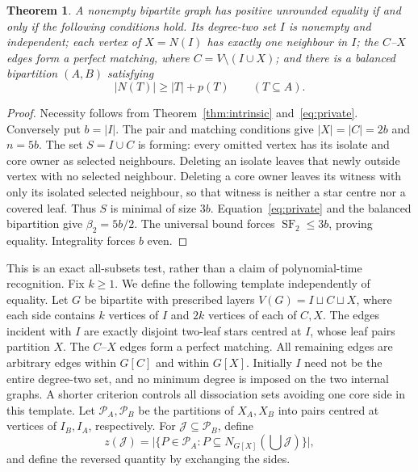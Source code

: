 \documentclass[11pt]{article}
\newtheorem{theorem}{Theorem}
\newcommand{\SF}{\operatorname{SF}_2}
\newcommand{\diss}{\beta_2}
\begin{document}
\begin{theorem}\label{thm:recognition}
A nonempty bipartite graph has positive unrounded equality if and only
if the following conditions hold. Its degree-two set $I$ is nonempty
and independent; each vertex of $X=N(I)$ has exactly one neighbour in
$I$; the $C$--$X$ edges form a perfect matching, where
$C=V\setminus(I\cup X)$; and there is a balanced bipartition $(A,B)$
satisfying
\[
 |N(T)|\ge |T|+p(T)\qquad(T\subseteq A).
\]
\end{theorem}
\begin{proof}
Necessity follows from Theorem~\ref{thm:intrinsic} and~\eqref{eq:private}.
Conversely put $b=|I|$. The pair and matching conditions give
$|X|=|C|=2b$ and $n=5b$. The set $S=I\cup C$ is forming: every
omitted vertex has its isolate and core owner as selected neighbours.
Deleting an isolate leaves that newly outside vertex with no selected
neighbour. Deleting a core owner leaves its witness with only its
isolated selected neighbour, so that witness is neither a star centre
nor a covered leaf. Thus $S$ is minimal of size $3b$.
Equation~\eqref{eq:private} and the balanced bipartition give
$\diss=5b/2$. The universal bound forces $\SF\le3b$, proving equality.
Integrality forces $b$ even.
\end{proof}

This is an exact all-subsets test, rather than a claim of polynomial-time
recognition. Fix $k\ge1$. We define the following template independently of equality.
Let $G$ be bipartite with prescribed layers $V(G)=I\sqcup C\sqcup X$,
where each side contains $k$ vertices of $I$ and $2k$ vertices of each
of $C,X$. The edges incident with $I$ are exactly disjoint two-leaf
stars centred at $I$, whose leaf pairs partition $X$. The $C$--$X$
edges form a perfect matching. All remaining edges are arbitrary
edges within $G[C]$ and within $G[X]$. Initially $I$ need not be the
entire degree-two set, and no minimum degree is imposed on the two
internal graphs. A shorter criterion controls all dissociation sets
avoiding one core side in this template.
Let $\mathcal P_A,\mathcal P_B$ be the partitions of $X_A,X_B$ into
pairs centred at vertices of $I_B,I_A$, respectively. For
$\mathcal J\subseteq\mathcal P_B$, define
\[
 z(\mathcal J)=\bigl|\{P\in\mathcal P_A:
 P\subseteq N_{G[X]}(\bigcup\mathcal J)\}\bigr|,
\]
and define the reversed quantity by exchanging the sides.
\end{document}
